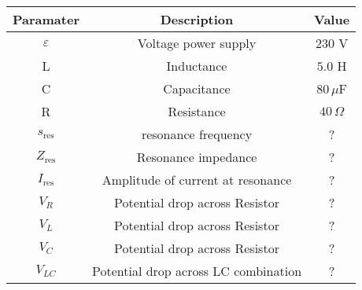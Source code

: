\begin{tabular}{|c|c|c|}
\hline
\textbf{Paramater} & \textbf{Description} & \textbf{Value}  \\ \hline
$\varepsilon$ & Voltage power supply & $230$ V  \\ \hline
L & Inductance & $5.0$ H  \\ \hline
C & Capacitance & $80\,\mu$F \\ \hline
R & Resistance & $40\,\Omega$ \\ \hline
$s_{\text{res}}$ & resonance frequency & ? \\ \hline 
$Z_{\text{res}} $& Resonance impedance & ? \\ \hline
$I_{\text{res}}$ & Amplitude of current at resonance & ? \\ \hline
$V_R$ & Potential drop across Resistor & ?\\ \hline
$V_L$ & Potential drop across Resistor & ? \\ \hline
$V_C$ & Potential drop across Resistor & ?\\ \hline
$V_{LC}$ & Potential drop across LC combination & ? \\ \hline
\end{tabular}
